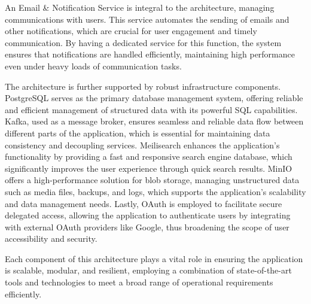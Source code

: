 An Email \& Notification Service is integral to the architecture, managing
communications with users. This service automates the sending of emails and
other notifications, which are crucial for user engagement and timely
communication. By having a dedicated service for this function, the system
ensures that notifications are handled efficiently, maintaining high performance
even under heavy loads of communication tasks.

The architecture is further supported by robust infrastructure components.
PostgreSQL serves as the primary database management system, offering reliable
and efficient management of structured data with its powerful SQL capabilities.
Kafka, used as a message broker, ensures seamless and reliable data flow between
different parts of the application, which is essential for maintaining data
consistency and decoupling services. Meilisearch enhances the application's
functionality by providing a fast and responsive search engine database, which
significantly improves the user experience through quick search results. MinIO
offers a high-performance solution for blob storage, managing unstructured data
such as media files, backups, and logs, which supports the application’s
scalability and data management needs. Lastly, OAuth is employed to facilitate
secure delegated access, allowing the application to authenticate users by
integrating with external OAuth providers like Google, thus broadening the scope
of user accessibility and security.

Each component of this architecture plays a vital role in ensuring the
application is scalable, modular, and resilient, employing a combination of
state-of-the-art tools and technologies to meet a broad range of operational
requirements efficiently.

